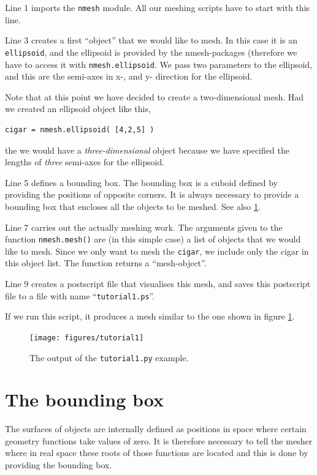 \documentclass[10pt,a4paper]{book}
\newcommand{\py}[1]{\texttt{\color{blue}#1}}
\begin{document}


Line 1 imports the \py{nmesh} module. All our meshing scripts have to
start with this line.

Line 3 creates a first ``object'' that we would like to mesh. In this
case it is an \py{ellipsoid}, and the ellipsoid is provided by the
nmesh-packages (therefore we have to access it with
\py{nmesh.ellipsoid}. We pass two parameters to the ellipsoid, and this are the semi-axes in x-, and y- direction for the ellipsoid.

Note that at this point we have decided to create a two-dimensional mesh. Had we created an ellipsoid object like this,
\begin{lstlisting}
cigar = nmesh.ellipsoid( [4,2,5] )
\end{lstlisting}
the we would have a \emph{three-dimensional} object because we have specified the lengths of \emph{three} semi-axes for the ellipsoid.

Line 5 defines a bounding box. The bounding box is a cuboid defined by providing the positions of opposite corners. It is always necessary to provide a bounding box that encloses all the objects to be meshed. See also \ref{sec:boundingbox}.

Line 7 carries out the actually meshing work. The arguments given to the function \py{nmesh.mesh()} are (in this simple case) a list of objects that we would like to mesh. Since we only want to mesh the \py{cigar}, we include only the cigar in this object list. The function returns a ``mesh-object''.

Line 9 creates a postscript file that visualises this mesh, and saves this postscript file to a file with name ``\texttt{tutorial1.ps}''.

If we run this script, it produces a mesh similar to the one shown in figure \ref{fig:tutorial1}.

\begin{figure}[tbh]
\centerline{\texttt{[image: figures/tutorial1]}}
\caption{\label{fig:tutorial1}The output of the \py{tutorial1.py} example.}
\end{figure}



\section{The bounding box}
\label{sec:boundingbox}
The surfaces of objects are internally defined as positions in space
where certain geometry functions take values of zero. It is therefore
necessary to tell the mesher where in real space these roots of those
functions are located and this is done by providing the bounding box.
\end{document}
